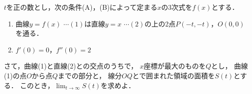 \documentclass[../../main.tex]{subfiles}
\begin{document}
$t$を正の数とし，次の条件(A)，(B)によって定まる$x$の3次式を$f(x)$とする．
\begin{enumerate}
  \item[(A)] 曲線$y=f(x)$ $\cdots(1)$は直線$y=x$ $\cdots(2)$の上の2点$P(-t,-t)$，$O(0,0)$を通る．
  \item[(B)] $f'(0)=0$，$f''(0)=2$
\end{enumerate}
さて，曲線(1)と直線(2)との交点のうちで，
$x$座標が最大のものを$Q$とし，
曲線(1)の点$O$から点$Q$までの部分と，
線分$OQ$とで囲まれた領域の面積を$S(t)$とする．
このとき，$\displaystyle\lim_{t\to\infty}S(t)$を求めよ．
\end{document}
